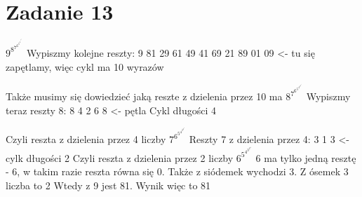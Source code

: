 \documentclass[12pt]{article}
\begin{document}
\section{Zadanie 13}
$9^{8^{7^{6^{5^{4^{3^{2^{1}}}}}}}}$
Wypiszmy kolejne reszty:
9
81
29
61
49
41
69
21
89
01
09 <- tu się zapętlamy, więc cykl ma 10 wyrazów

Także musimy się dowiedzieć jaką reszte z dzielenia przez 10 ma $8^{7^{6^{5^{4^{3^{2^{1}}}}}}}$
Wypiszmy teraz reszty 8:
8
4
2
6
8 <- pętla 
Cykl długości 4

Czyli reszta z dzielenia przez 4 liczby $7^{6^{5^{4^{3^{2^{1}}}}}}$
Reszty 7 z dzielenia przez 4:
3
1
3 <- cylk długości 2
Czyli reszta z dzielenia przez 2 liczby $6^{5^{4^{3^{2^{1}}}}}$
6 ma tylko jedną resztę - 6, w takim razie reszta równa się 0.
Także z siódemek wychodzi 3.
Z ósemek 3 liczba to 2
Wtedy z 9 jest 81.
Wynik więc to 81


\egroup
\end{document}
